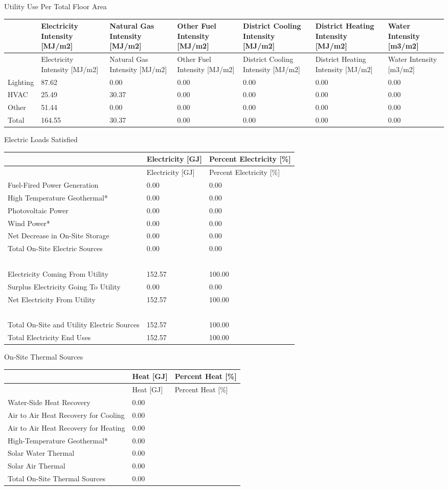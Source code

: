 Utility Use Per Total Floor Area

\begin{longtable}[c]{>{\raggedright}p{0.85in}>{\raggedright}p{0.85in}>{\raggedright}p{0.85in}p{0.85in}p{0.85in}p{0.85in}p{0.85in}}
\toprule 
~ & Electricity Intensity [MJ/m2] & Natural Gas Intensity [MJ/m2] & Other Fuel Intensity [MJ/m2] & District Cooling Intensity [MJ/m2] & District Heating Intensity [MJ/m2] & Water Intensity [m3/m2] \tabularnewline
\midrule
\endfirsthead

\toprule 
~ & Electricity Intensity [MJ/m2] & Natural Gas Intensity [MJ/m2] & Other Fuel Intensity [MJ/m2] & District Cooling Intensity [MJ/m2] & District Heating Intensity [MJ/m2] & Water Intensity [m3/m2] \tabularnewline
\midrule
\endhead

Lighting & 87.62 & 0.00 & 0.00 & 0.00 & 0.00 & 0.00 \tabularnewline
HVAC & 25.49 & 30.37 & 0.00 & 0.00 & 0.00 & 0.00 \tabularnewline
Other & 51.44 & 0.00 & 0.00 & 0.00 & 0.00 & 0.00 \tabularnewline
Total & 164.55 & 30.37 & 0.00 & 0.00 & 0.00 & 0.00 \tabularnewline
\bottomrule
\end{longtable}

Electric Loads Satisfied

\begin{longtable}[c]{>{\raggedright}p{2.9in}p{1.5in}p{1.59in}}
\toprule 
~ & Electricity [GJ] & Percent Electricity [\%] \tabularnewline
\midrule
\endfirsthead

\toprule 
~ & Electricity [GJ] & Percent Electricity [\%] \tabularnewline
\midrule
\endhead

Fuel-Fired Power Generation & 0.00 & 0.00 \tabularnewline
High Temperature Geothermal* & 0.00 & 0.00 \tabularnewline
Photovoltaic Power & 0.00 & 0.00 \tabularnewline
Wind Power* & 0.00 & 0.00 \tabularnewline
Net Decrease in On-Site Storage & 0.00 & 0.00 \tabularnewline
Total On-Site Electric Sources & 0.00 & 0.00 \tabularnewline
~ & ~ & ~ \tabularnewline
Electricity Coming From Utility & 152.57 & 100.00 \tabularnewline
Surplus Electricity Going To Utility & 0.00 & 0.00 \tabularnewline
Net Electricity From Utility & 152.57 & 100.00 \tabularnewline
~ & ~ & ~ \tabularnewline
Total On-Site and Utility Electric Sources & 152.57 & 100.00 \tabularnewline
Total Electricity End Uses & 152.57 & 100.00 \tabularnewline
\bottomrule
\end{longtable}

On-Site Thermal Sources

\begin{longtable}[c]{@{}lll@{}}
\toprule 
~ & Heat [GJ] & Percent Heat [\%] \tabularnewline
\midrule
\endfirsthead

\toprule 
~ & Heat [GJ] & Percent Heat [\%] \tabularnewline
\midrule
\endhead

Water-Side Heat Recovery & 0.00 & ~ \tabularnewline
Air to Air Heat Recovery for Cooling & 0.00 & ~ \tabularnewline
Air to Air Heat Recovery for Heating & 0.00 & ~ \tabularnewline
High-Temperature Geothermal* & 0.00 & ~ \tabularnewline
Solar Water Thermal & 0.00 & ~ \tabularnewline
Solar Air Thermal & 0.00 & ~ \tabularnewline
Total On-Site Thermal Sources & 0.00 & ~ \tabularnewline
\bottomrule
\end{longtable}


